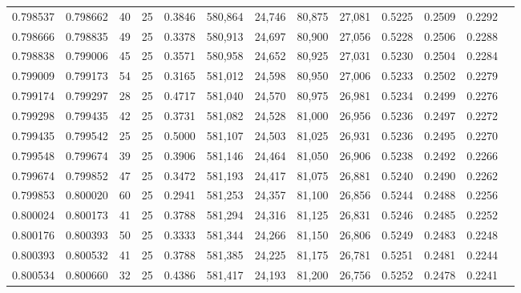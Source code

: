 \begin{tabular}{rrrrrrrrrrrrr}
0.798537 & 0.798662 &    40 &  25 &                                     0.3846 & 580,864 &  24,746 &  80,875 &  27,081 & 0.5225 & 0.2509 & 0.2292 \\
0.798666 & 0.798835 &    49 &  25 &                                     0.3378 & 580,913 &  24,697 &  80,900 &  27,056 & 0.5228 & 0.2506 & 0.2288 \\
0.798838 & 0.799006 &    45 &  25 &                                     0.3571 & 580,958 &  24,652 &  80,925 &  27,031 & 0.5230 & 0.2504 & 0.2284 \\
0.799009 & 0.799173 &    54 &  25 &                                     0.3165 & 581,012 &  24,598 &  80,950 &  27,006 & 0.5233 & 0.2502 & 0.2279 \\
0.799174 & 0.799297 &    28 &  25 &                                     0.4717 & 581,040 &  24,570 &  80,975 &  26,981 & 0.5234 & 0.2499 & 0.2276 \\
0.799298 & 0.799435 &    42 &  25 &                                     0.3731 & 581,082 &  24,528 &  81,000 &  26,956 & 0.5236 & 0.2497 & 0.2272 \\
0.799435 & 0.799542 &    25 &  25 &                                     0.5000 & 581,107 &  24,503 &  81,025 &  26,931 & 0.5236 & 0.2495 & 0.2270 \\
0.799548 & 0.799674 &    39 &  25 &                                     0.3906 & 581,146 &  24,464 &  81,050 &  26,906 & 0.5238 & 0.2492 & 0.2266 \\
0.799674 & 0.799852 &    47 &  25 &                                     0.3472 & 581,193 &  24,417 &  81,075 &  26,881 & 0.5240 & 0.2490 & 0.2262 \\
0.799853 & 0.800020 &    60 &  25 &                                     0.2941 & 581,253 &  24,357 &  81,100 &  26,856 & 0.5244 & 0.2488 & 0.2256 \\
0.800024 & 0.800173 &    41 &  25 &                                     0.3788 & 581,294 &  24,316 &  81,125 &  26,831 & 0.5246 & 0.2485 & 0.2252 \\
0.800176 & 0.800393 &    50 &  25 &                                     0.3333 & 581,344 &  24,266 &  81,150 &  26,806 & 0.5249 & 0.2483 & 0.2248 \\
0.800393 & 0.800532 &    41 &  25 &                                     0.3788 & 581,385 &  24,225 &  81,175 &  26,781 & 0.5251 & 0.2481 & 0.2244 \\
0.800534 & 0.800660 &    32 &  25 &                                     0.4386 & 581,417 &  24,193 &  81,200 &  26,756 & 0.5252 & 0.2478 & 0.2241 \\

\end{tabular}
